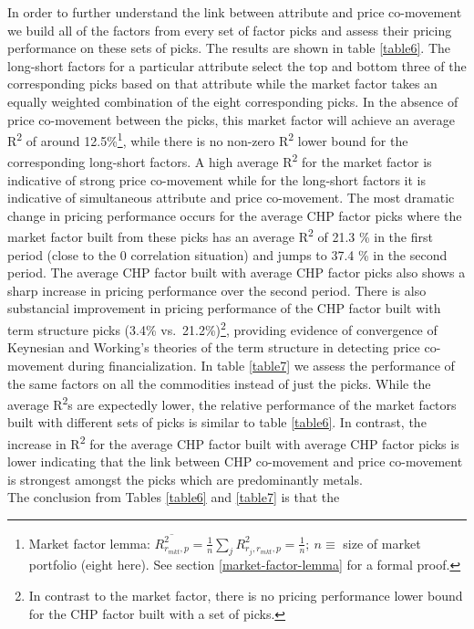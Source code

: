 \documentclass[]{elsarticle} %
\begin{document}
In order to further understand the link between attribute and price
co-movement we build all of the factors from every set of factor picks
and assess their pricing performance on these sets of picks. The results
are shown in table \ref{table6}. The long-short factors for a particular
attribute select the top and bottom three of the corresponding picks
based on that attribute while the market factor takes an equally
weighted combination of the eight corresponding picks. In the absence of
price co-movement between the picks, this market factor will achieve an
average R\textsuperscript{2} of around 12.5\%\footnote{Market factor
  lemma:
  \(\overline{R_{r_{mkt}, p}^{2}} = \frac{1}{n} \sum_{j} R_{r_{j}, r_{mkt}, p}^{2} = \frac{1}{n}; \: n\equiv\)
  size of market portfolio (eight here). See section
  \ref{market-factor-lemma} for a formal proof.}, while there is no
non-zero R\textsuperscript{2} lower bound for the corresponding
long-short factors. A high average R\textsuperscript{2} for the market
factor is indicative of strong price co-movement while for the
long-short factors it is indicative of simultaneous attribute and price
co-movement. The most dramatic change in pricing performance occurs for
the average CHP factor picks where the market factor built from these
picks has an average R\textsuperscript{2} of 21.3 \% in the first period
(close to the 0 correlation situation) and jumps to 37.4 \% in the
second period. The average CHP factor built with average CHP factor
picks also shows a sharp increase in pricing performance over the second
period. There is also substancial improvement in pricing performance of
the CHP factor built with term structure picks (3.4\%
vs.~21.2\%)\footnote{In contrast to the market factor, there is no
  pricing performance lower bound for the CHP factor built with a set of
  picks.}, providing evidence of convergence of Keynesian and Working's
theories of the term structure in detecting price co-movement during
financialization. In table \ref{table7} we assess the performance of the
same factors on all the commodities instead of just the picks. While the
average R\textsuperscript{2}s are expectedly lower, the relative
performance of the market factors built with different sets of picks is
similar to table \ref{table6}. In contrast, the increase in
R\textsuperscript{2} for the average CHP factor built with average CHP
factor picks is lower indicating that the link between CHP co-movement
and price co-movement is strongest amongst the picks which are
predominantly metals.\\
The conclusion from Tables \ref{table6} and \ref{table7} is that the
\end{document}
